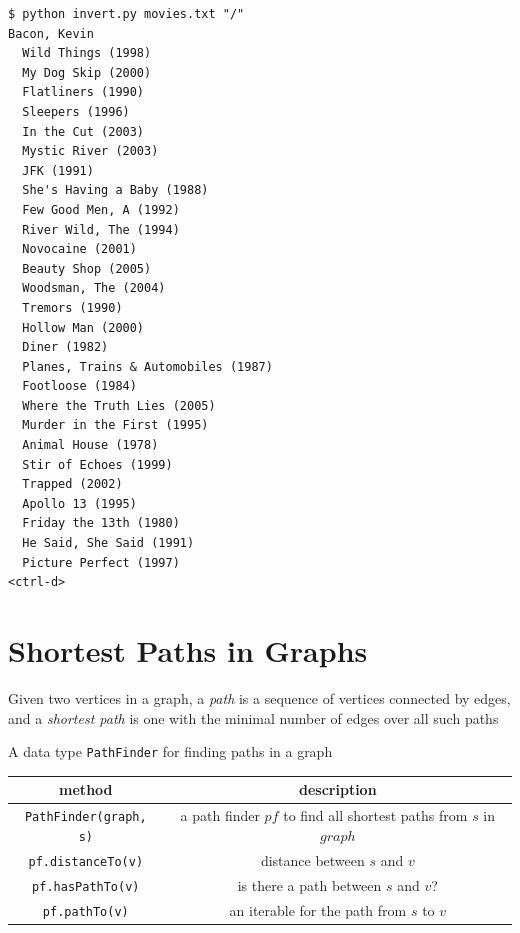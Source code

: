 \documentclass[8pt,a4paper,compress,handout]{beamer}
\begin{document}
\begin{frame}[fragile]
\begin{lstlisting}[language={}]
$ python invert.py movies.txt "/"
Bacon, Kevin
  Wild Things (1998)
  My Dog Skip (2000)
  Flatliners (1990)
  Sleepers (1996)
  In the Cut (2003)
  Mystic River (2003)
  JFK (1991)
  She's Having a Baby (1988)
  Few Good Men, A (1992)
  River Wild, The (1994)
  Novocaine (2001)
  Beauty Shop (2005)
  Woodsman, The (2004)
  Tremors (1990)
  Hollow Man (2000)
  Diner (1982)
  Planes, Trains & Automobiles (1987)
  Footloose (1984)
  Where the Truth Lies (2005)
  Murder in the First (1995)
  Animal House (1978)
  Stir of Echoes (1999)
  Trapped (2002)
  Apollo 13 (1995)
  Friday the 13th (1980)
  He Said, She Said (1991)
  Picture Perfect (1997)
<ctrl-d>
\end{lstlisting}
\end{frame}

\section{Shortest Paths in Graphs}
\begin{frame}[fragile]
Given two vertices in a graph, a \emph{path} is a sequence of vertices connected by edges, and a \emph{shortest path} is one with the minimal number of edges over all such paths

\bigskip

A data type \lstinline{PathFinder} for finding paths in a graph
\begin{center}
\begin{tabular}{cc}
method & description \\ \hline
\lstinline$PathFinder(graph, s)$ & a path finder $pf$ to find all shortest paths from $s$ in $graph$ \\
\lstinline$pf.distanceTo(v)$ & distance between $s$ and $v$ \\
\lstinline$pf.hasPathTo(v)$ & is there a path between $s$ and $v$? \\
\lstinline$pf.pathTo(v)$ & an iterable for the path from $s$ to $v$
\end{tabular} 
\end{center}
\end{frame}
\end{document}
